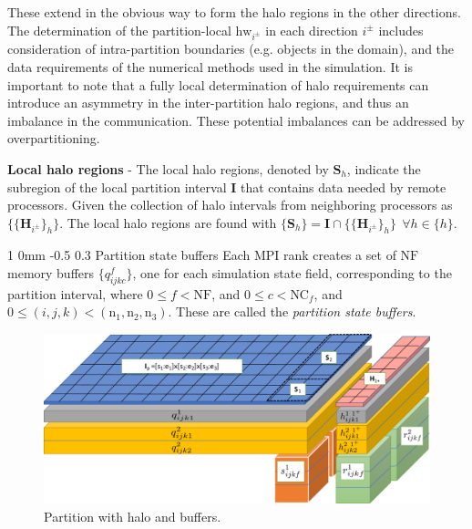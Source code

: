\documentclass[11pt]{article}
\makeatletter
\renewcommand{\subsubsection}{\@startsection
{subsubsection}%
{1}%
{0mm}%
{-0.5\baselineskip}%
{0.3\baselineskip}%
{\normalfont\normalsize\itshape\centering\color{myBrown}}}%
\makeatother
\begin{document}
These extend in the obvious way to form the halo regions in the other directions. The determination of the partition-local $\text{hw}_{i^{\pm}}$ in each direction $i^{\pm}$ includes consideration of intra-partition boundaries (e.g. objects in the domain), and the data requirements of the numerical methods used in the simulation. It is important to note that a fully local determination of halo requirements can introduce an asymmetry in the inter-partition halo regions, and thus an imbalance in the communication. These potential imbalances can be addressed by overpartitioning.   

\textbf{Local halo regions} - The local halo regions, denoted by $\textbf{S}_h$, indicate the subregion of the local partition interval $\textbf{I}$ that contains data needed by remote processors.   Given the collection of halo intervals from neighboring processors as $\{\{\textbf{H}_{i^{\pm}}\}_h\}$. The local halo regions are found with $\{\textbf{S}_h\} = \textbf{I}\cap\{\{\textbf{H}_{i^{\pm}}\}_h\}~~\forall h\in\{h\}$.

\subsubsection{Partition state buffers}
Each MPI rank creates a set of $\text{NF}$ memory buffers $\{\textit{q}^f_{ijkc}\}$, one for each simulation state field, corresponding to the partition interval, where $0 \leq f < \text{NF}$, and $0 \leq c < \text{NC}_f$, and $0 \leq (i,j,k)< (\text{n}_1,\text{n}_2,\text{n}_3)$.   These are called the \textit{partition state buffers}.  

\begin{figure}[h]
\begin{center}
\includegraphics[width=\textwidth]{Figures/PartitionWithBuffers}
\vspace{-20pt}
\caption{Partition with halo and buffers.}\label{fig:Buffers}
\end{center}
\end{figure}
\end{document}
